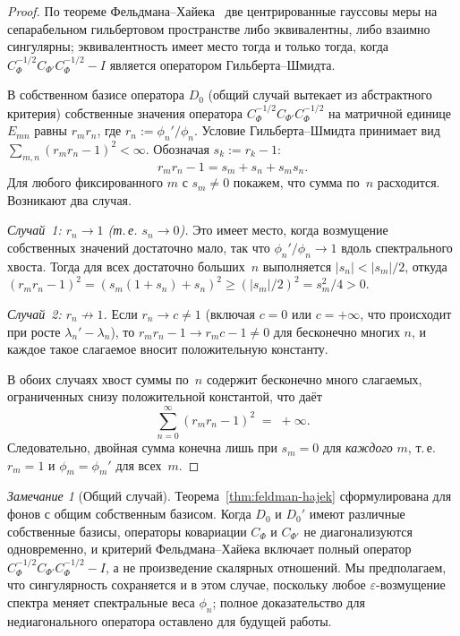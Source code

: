 \documentclass[12pt,a4paper]{article}
\theoremstyle{plain}
\theoremstyle{definition}
\theoremstyle{remark}
\newtheorem{remark}[theorem]{Замечание}
\begin{document}
\begin{proof}
По теореме Фельдмана--Хайека~\cite{Feldman:1958,Hajek:1958,Bogachev:1998}
две центрированные гауссовы меры на сепарабельном гильбертовом
пространстве либо эквивалентны, либо взаимно сингулярны; эквивалентность
имеет место тогда и только тогда, когда
$C_\Phi^{-1/2} C_{\Phi'} C_\Phi^{-1/2} - I$ является
оператором Гильберта--Шмидта.

В собственном базисе оператора $D_0$
(общий случай вытекает из абстрактного критерия)
собственные значения оператора
$C_\Phi^{-1/2} C_{\Phi'} C_\Phi^{-1/2}$ на матричной единице $E_{mn}$
равны $r_m r_n$, где $r_n := \phi_n'/\phi_n$.  Условие Гильберта--Шмидта
принимает вид $\sum_{m,n}(r_m r_n - 1)^2 < \infty$.  Обозначая
$s_k := r_k - 1$:
\[
  r_m r_n - 1 = s_m + s_n + s_m s_n.
\]
Для любого фиксированного $m$ с $s_m \ne 0$ покажем, что сумма по~$n$
расходится.  Возникают два случая.

\emph{Случай~1: $r_n \to 1$ (т.\,е. $s_n \to 0$).}  Это имеет место,
когда возмущение собственных значений достаточно мало, так что
$\phi_n'/\phi_n \to 1$ вдоль спектрального хвоста.
Тогда для всех достаточно больших~$n$ выполняется
$|s_n| < |s_m|/2$, откуда $(r_m r_n - 1)^2 = (s_m(1+s_n)+s_n)^2
\ge (|s_m|/2)^2 = s_m^2/4 > 0$.

\emph{Случай~2: $r_n \not\to 1$.}  Если $r_n \to c \ne 1$
(включая $c = 0$ или $c = +\infty$, что происходит при росте
$\lambda_n' - \lambda_n$), то $r_m r_n - 1 \to r_m c - 1 \ne 0$
для бесконечно многих $n$, и каждое такое слагаемое вносит
положительную константу.

В обоих случаях хвост суммы по~$n$ содержит бесконечно много
слагаемых, ограниченных снизу положительной константой, что даёт
\[
  \sum_{n=0}^\infty (r_m r_n - 1)^2 \;=\; +\infty.
\]
Следовательно, двойная сумма конечна лишь при $s_m = 0$ для
\emph{каждого} $m$, т.\,е. $r_m = 1$ и $\phi_m = \phi_m'$
для всех~$m$.
\end{proof}

\begin{remark}[Общий случай]
\label{rem:fh-general}
Теорема~\ref{thm:feldman-hajek} сформулирована для фонов с общим
собственным базисом.  Когда $D_0$ и $D_0'$ имеют различные собственные
базисы, операторы ковариации $C_\Phi$ и $C_{\Phi'}$ не
диагонализуются одновременно, и критерий Фельдмана--Хайека
включает полный оператор
$C_\Phi^{-1/2}C_{\Phi'}C_\Phi^{-1/2} - I$, а не произведение
скалярных отношений.  Мы предполагаем, что сингулярность
сохраняется и в этом случае, поскольку любое $\varepsilon$-возмущение
спектра меняет спектральные веса $\phi_n$; полное доказательство
для недиагонального оператора оставлено для будущей работы.
\end{remark}
\end{document}
